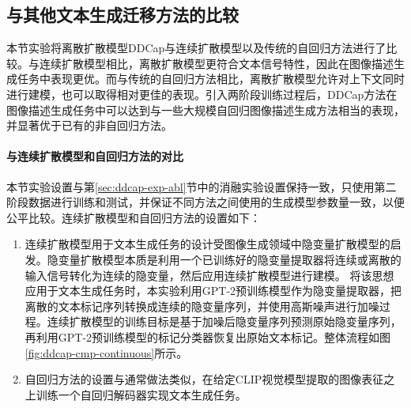 \subsection{与其他文本生成迁移方法的比较}
本节实验将离散扩散模型DDCap与连续扩散模型以及传统的自回归方法进行了比较。与连续扩散模型相比，离散扩散模型更符合文本信号特性，因此在图像描述生成任务中表现更优。而与传统的自回归方法相比，离散扩散模型允许对上下文同时进行建模，也可以取得相对更佳的表现。引入两阶段训练过程后，DDCap方法在图像描述生成任务中可以达到与一些大规模自回归图像描述生成方法相当的表现，并显著优于已有的非自回归方法。

\paragraph{与连续扩散模型和自回归方法的对比} 
本节实验设置与第\ref{sec:ddcap-exp-abl}节中的消融实验设置保持一致，只使用第二阶段数据进行训练和测试，并保证不同方法之间使用的生成模型参数量一致，以便公平比较。连续扩散模型和自回归方法的设置如下：
\begin{enumerate}
    \item 连续扩散模型用于文本生成任务的设计受图像生成领域中隐变量扩散模型\cite{latentdiff}的启发。隐变量扩散模型本质是利用一个已训练好的隐变量提取器将连续或离散的输入信号转化为连续的隐变量，然后应用连续扩散模型进行建模。
    将该思想应用于文本生成任务时，本实验利用GPT-2预训练模型作为隐变量提取器，把离散的文本标记序列转换成连续的隐变量序列，并使用高斯噪声进行加噪过程。连续扩散模型的训练目标是基于加噪后隐变量序列预测原始隐变量序列，再利用GPT-2预训练模型的标记分类器恢复出原始文本标记。整体流程如图\ref{fig:ddcap-cmp-continuous}所示。
    \item 自回归方法的设置与通常做法类似，在给定CLIP视觉模型提取的图像表征之上训练一个自回归解码器实现文本生成任务。%
\end{enumerate}

